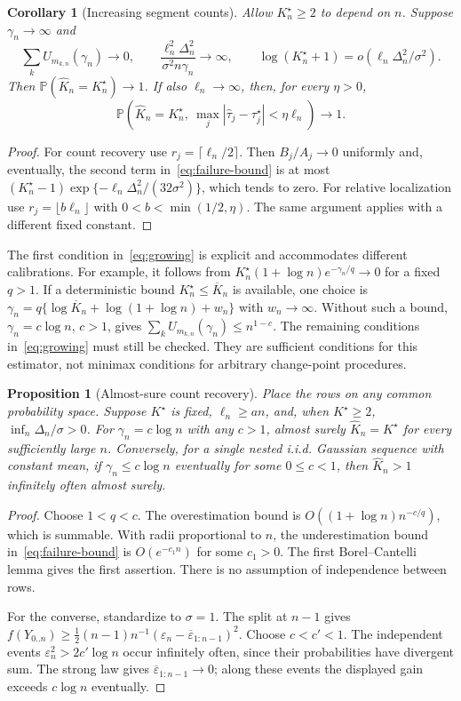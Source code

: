 \documentclass[pdflatex,sn-mathphys-num]{sn-jnl}
\newcommand{\Prob}{\mathbb P}
\newcommand{\taus}{\tau^\star}
\newcommand{\Kh}{\widehat K_n}
\theoremstyle{thmstyleone}
\newtheorem{proposition}[theorem]{Proposition}
\newtheorem{corollary}[theorem]{Corollary}
\theoremstyle{thmstyletwo}
\begin{document}
\begin{corollary}[Increasing segment counts]\label{cor:growing}
Allow $K_n^\star\ge2$ to depend on $n$. Suppose $\gamma_n\to\infty$ and
\begin{equation}\label{eq:growing}
\sum_k U_{m_{k,n}}(\gamma_n)\to0,\qquad
\frac{\ell_n^2\Delta_n^2}{\sigma^2 n\gamma_n}\to\infty,\qquad
\log(K_n^\star+1)=o(\ell_n\Delta_n^2/\sigma^2).
\end{equation}
Then $\Prob(\Kh=K_n^\star)\to1$.
If also $\ell_n\to\infty$, then, for every $\eta>0$,
\[
\Prob\left(\Kh=K_n^\star,\
\max_j|\widehat\tau_j-\taus_j|<\eta\ell_n\right)\to1.
\]
\end{corollary}
\begin{proof}
For count recovery use $r_j=\lceil\ell_n/2\rceil$. Then $B_j/A_j\to0$ uniformly
and, eventually, the second term in~\eqref{eq:failure-bound} is at most
$(K_n^\star-1)\exp\{-\ell_n\Delta_n^2/(32\sigma^2)\}$, which tends to zero.
For relative localization use $r_j=\lfloor b\ell_n\rfloor$ with
$0<b<\min(1/2,\eta)$. The same argument applies with a different fixed constant.
\end{proof}

The first condition in~\eqref{eq:growing} is explicit and accommodates different
calibrations. For example, it follows from
$K_n^\star(1+\log n)e^{-\gamma_n/q}\to0$ for a fixed $q>1$.
If a deterministic bound $K_n^\star\le\overline K_n$ is available, one choice is
$\gamma_n=q\{\log\overline K_n+\log(1+\log n)+w_n\}$ with $w_n\to\infty$.
Without such a bound, $\gamma_n=c\log n$, $c>1$, gives
$\sum_kU_{m_{k,n}}(\gamma_n)\le n^{1-c}$.
The remaining conditions in~\eqref{eq:growing} must still be checked.
They are sufficient conditions for this estimator, not minimax conditions
for arbitrary change-point procedures.

\begin{proposition}[Almost-sure count recovery]\label{prop:strong}
Place the rows on any common probability space. Suppose $K^\star$ is fixed,
$\ell_n\ge an$, and, when $K^\star\ge2$, $\inf_n\Delta_n/\sigma>0$.
For $\gamma_n=c\log n$ with any $c>1$, almost surely
$\Kh=K^\star$ for every sufficiently large $n$.
Conversely, for a single nested i.i.d. Gaussian sequence with constant mean,
if $\gamma_n\le c\log n$ eventually for some $0\le c<1$, then
$\Kh>1$ infinitely often almost surely.
\end{proposition}
\begin{proof}
Choose $1<q<c$. The overestimation bound is
$O((1+\log n)n^{-c/q})$, which is summable. With radii proportional to $n$,
the underestimation bound in~\eqref{eq:failure-bound} is $O(e^{-c_1n})$ for
some $c_1>0$. The first Borel--Cantelli lemma gives the first assertion.
There is no assumption of independence between rows.

For the converse, standardize to $\sigma=1$. The split at $n-1$ gives
$f(Y_{0..n})\ge\tfrac12(n-1)n^{-1}
(\varepsilon_n-\overline\varepsilon_{1:n-1})^2$.
Choose $c<c'<1$. The independent events
$\varepsilon_n^2>2c'\log n$ occur infinitely often, since their probabilities
have divergent sum. The strong law gives
$\overline\varepsilon_{1:n-1}\to0$; along these events the displayed gain
exceeds $c\log n$ eventually.
\end{proof}
\end{document}
